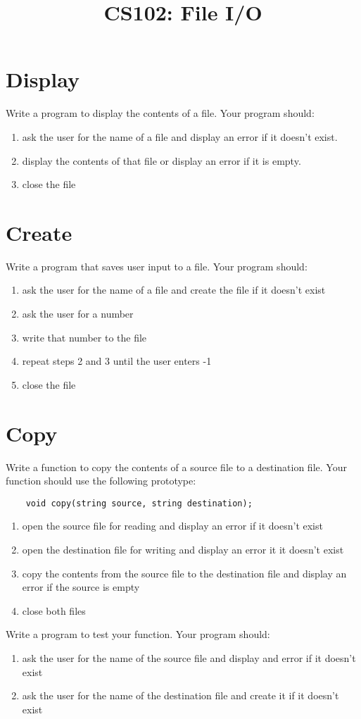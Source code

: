 \documentclass{article}
\begin{document}
\title{CS102: File I/O}

\maketitle

\section{Display}
Write a program to display the contents of a file. Your program should:
\begin{enumerate}
	\item ask the user for the name of a file and display an error if it doesn't exist.
	\item display the contents of that file or display an error if it is empty.
	\item close the file
\end{enumerate}

\section{Create}
Write a program that saves user input to a file. Your program should:
\begin{enumerate}
	\item ask the user for the name of a file and create the file if it doesn't exist
	\item ask the user for a number
	\item write that number to the file
	\item repeat steps 2 and 3 until the user enters -1
	\item close the file
\end{enumerate}

\section{Copy}
Write a function to copy the contents of a source file to a destination file. Your function should use the following prototype:
\begin{verbatim}
	void copy(string source, string destination);
\end{verbatim}
\begin{enumerate}
	\item open the source file for reading and display an error if it doesn't exist
	\item open the destination file for writing and display an error it it doesn't exist
	\item copy the contents from the source file to the destination file and display an error if the source is empty
	\item close both files
\end{enumerate}
Write a program to test your function. Your program should:
\begin{enumerate}
	\item ask the user for the name of the source file and display and error if it doesn't exist
	\item ask the user for the name of the destination file and create it if it doesn't exist
\end{enumerate}
\end{document}
